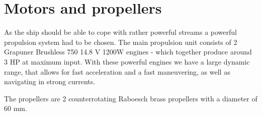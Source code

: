 \section{Motors and propellers}

As the ship should be able to cope with rather powerful streams a powerful propulsion system had to be chosen. The main propulsion unit consists of 2 Grapuner Brushless 750 14.8 V 1200W engines - which together produce around 3 HP at maximum input. With these powerful engines we have a large dynamic range, that allows for fast acceleration and a fast maneuvering, as well as navigating in strong currents. 

The propellers are 2 counterrotating Raboesch brass propellers with a diameter of 60 mm. 